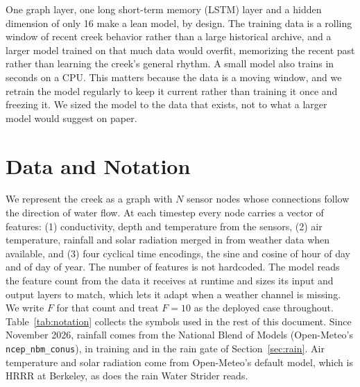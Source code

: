 \documentclass{article}
\begin{document}
One graph layer, one long short-term memory (LSTM) layer and a hidden
dimension of only 16 make a lean model, by design. The training data is a
rolling window of recent creek behavior rather than a large historical
archive, and a larger model trained on that much data would overfit,
memorizing the recent past rather than learning the creek's general rhythm. A
small model also trains in seconds on a CPU. This matters because the data is a
moving window, and we retrain the model regularly to keep it current rather
than training it once and freezing it. We sized the model to the data that
exists, not to what a larger model would suggest on paper.

\section{Data and Notation}
\label{sec:data}

We represent the creek as a graph with $N$ sensor nodes whose connections follow
the direction of water flow. At each timestep every node carries a vector of
features: (1) conductivity, depth and temperature from the sensors, (2) air
temperature, rainfall and solar radiation merged in from weather data when
available, and (3) four cyclical time encodings, the sine and cosine of hour of
day and of day of year. The number of features is not hardcoded. The model
reads the feature count from the data it receives at runtime and sizes its
input and output layers to match, which lets it adapt when a weather channel is
missing. We write $F$ for that count and treat $F = 10$ as the deployed case
throughout. Table~\ref{tab:notation} collects the symbols used in the rest of
this document. Since November 2026, rainfall comes from the National Blend of
Models (Open-Meteo's \texttt{ncep\_nbm\_conus}), in training and in the rain
gate of Section~\ref{sec:rain}. Air temperature and solar radiation come from
Open-Meteo's default model, which is HRRR at Berkeley, as does the rain Water
Strider reads.
\end{document}
